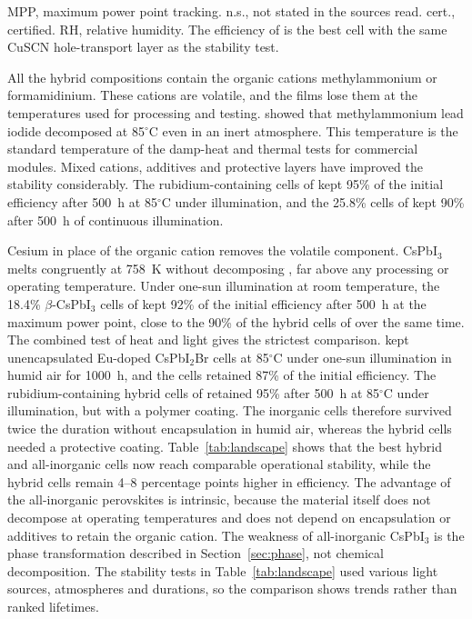 \begin{table}[htbp]
  \vspace{0.3em}
  \raggedright\scriptsize MPP, maximum power point tracking. n.s., not stated in the sources read. cert., certified. RH, relative humidity. The efficiency of \citet{Mali2021} is the best cell with the same CuSCN hole-transport layer as the stability test.
\end{table}

All the hybrid compositions contain the organic cations methylammonium or formamidinium. These cations are volatile, and the films lose them at the temperatures used for processing and testing. \citet{Conings2015} showed that methylammonium lead iodide decomposed at 85$^\circ$C even in an inert atmosphere. This temperature is the standard temperature of the damp-heat and thermal tests for commercial modules. Mixed cations, additives and protective layers have improved the stability considerably. The rubidium-containing cells of \citet{Saliba2016Rb} kept 95\% of the initial efficiency after 500~h at 85$^\circ$C under illumination, and the 25.8\% cells of \citet{Min2021} kept 90\% after 500~h of continuous illumination.

Cesium in place of the organic cation removes the volatile component. CsPbI$_3$ melts congruently at 758~K without decomposing \citep{vanHattem2023}, far above any processing or operating temperature. Under one-sun illumination at room temperature, the 18.4\% $\beta$-CsPbI$_3$ cells of \citet{Wang2019} kept 92\% of the initial efficiency after 500~h at the maximum power point, close to the 90\% of the hybrid cells of \citet{Min2021} over the same time. The combined test of heat and light gives the strictest comparison. \citet{Mali2021} kept unencapsulated Eu-doped CsPbI$_2$Br cells at 85$^\circ$C under one-sun illumination in humid air for 1000~h, and the cells retained 87\% of the initial efficiency. The rubidium-containing hybrid cells of \citet{Saliba2016Rb} retained 95\% after 500~h at 85$^\circ$C under illumination, but with a polymer coating. The inorganic cells therefore survived twice the duration without encapsulation in humid air, whereas the hybrid cells needed a protective coating. Table~\ref{tab:landscape} shows that the best hybrid and all-inorganic cells now reach comparable operational stability, while the hybrid cells remain 4--8 percentage points higher in efficiency. The advantage of the all-inorganic perovskites is intrinsic, because the material itself does not decompose at operating temperatures and does not depend on encapsulation or additives to retain the organic cation. The weakness of all-inorganic CsPbI$_3$ is the phase transformation described in Section~\ref{sec:phase}, not chemical decomposition. The stability tests in Table~\ref{tab:landscape} used various light sources, atmospheres and durations, so the comparison shows trends rather than ranked lifetimes.

